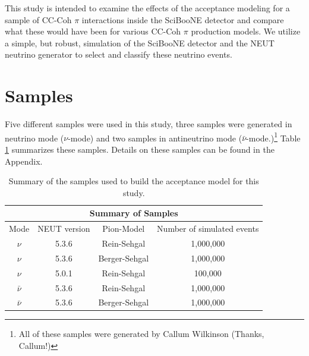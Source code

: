\documentclass[11pt]{article}
\begin{document}
This study is intended to examine the effects of the acceptance modeling for a sample of CC-Coh $\pi$ interactions inside the SciBooNE detector and compare what these would have been for various CC-Coh $\pi$ production models. We utilize a simple, but robust, simulation of the SciBooNE detector and the NEUT neutrino generator to select and classify these neutrino events. 



\section{Samples}
\label{sec:samples}
Five different samples were used in this study, three samples were generated in neutrino mode ($\nu$-mode) and two samples in antineutrino mode ($\bar{\nu}$-mode.)\footnote{All of these samples were generated by Callum Wilkinson (Thanks, Callum!)} Table \ref*{tab:samples} summarizes these samples. Details on these samples can be found in the Appendix.

\begin{center}
\begin{table}[htb]
	\begin{center}
	\begin{tabular}{c|c|c|c}
	\multicolumn{4}{c}{\textbf{Summary of Samples}} \\
	\hline \hline
	 Mode & NEUT version & Pion-Model & Number of simulated events\\
	\hline
	 $\nu$ & 5.3.6 & Rein-Sehgal & 1,000,000 \\
	\hline
	$\nu$ & 5.3.6 & Berger-Sehgal & 1,000,000 \\
	\hline
	$\nu$ & 5.0.1 & Rein-Sehgal & 100,000 \\
	\hline
	 $\bar{\nu}$ & 5.3.6 & Rein-Sehgal & 1,000,000 \\
	\hline
	$\bar{\nu}$ & 5.3.6 & Berger-Sehgal & 1,000,000 \\
	\hline
	\end{tabular}%
	\caption{Summary of the samples used to build the acceptance model for this study.}
	\label{tab:samples}
	\end{center}
\end{table}
\end{center}



\end{document}
